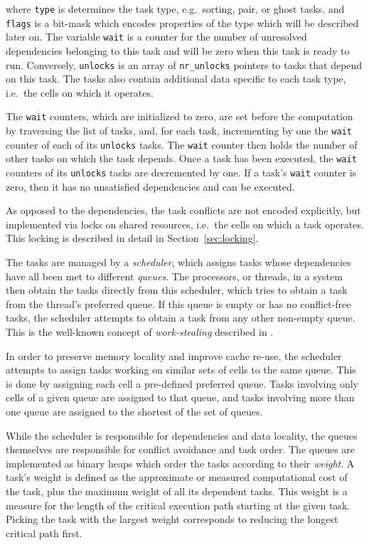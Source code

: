 \documentclass[final]{siamltex}
\newcommand{\sect}[1]
    {Section~\ref{sec:#1}}
\begin{document}
\noindent where {\tt type} is determines the task type, e.g.~sorting,
pair, or ghost tasks, and {\tt flags} is a bit-mask
which encodes properties of the type which will be described
later on.
The variable {\tt wait} is a counter for the number of
unresolved dependencies belonging to this task and will be
zero when this task is ready to run.
Conversely, {\tt unlocks} is an array of {\tt nr\_unlocks}
pointers to tasks that depend on this task.
The tasks also contain additional data specific to each task
type, i.e.~the cells on which it operates.

The {\tt wait} counters, which are initialized to zero, are
set before the computation by traversing the list of tasks, and,
for each task, incrementing by one the {\tt wait} counter of each of its
{\tt unlocks} tasks.
The {\tt wait} counter then holds the number of other tasks on which
the task depends.
Once a task has been executed, the {\tt wait} counters of its
{\tt unlocks} tasks are decremented by one.
If a task's {\tt wait} counter is zero, then it has no
unsatisfied dependencies and can be executed.

As opposed to the dependencies, the task conflicts are not
encoded explicitly, but implemented via locks on shared resources,
i.e.~the cells on which a task operates.
This locking is described in detail in \sect{locking}.

The tasks are managed by a {\em scheduler}, which assigns tasks
whose dependencies have all been met to different {\em queues}.
The processors, or threads, in a system then obtain the tasks
directly from this scheduler, which tries to obtain a task
from the thread's preferred queue.
If this queue is empty or has no conflict-free tasks, the scheduler
attempts to obtain a task from any other non-empty queue.
This is the well-known concept of {\em work-stealing} described
in \cite{ref:Blumofe1999}.

In order to preserve memory locality and improve cache re-use,
the scheduler attempts to assign tasks working on similar sets
of cells to the same queue.
This is done by assigning each cell a pre-defined preferred queue.
Tasks involving only cells of a given queue are assigned to that
queue, and tasks involving more than one queue are assigned to
the shortest of the set of queues.

While the scheduler is responsible for dependencies and data
locality, the queues themselves are responsible for conflict
avoidance and task order.
The queues are implemented as binary heaps which order the tasks
according to their {\em weight}.
A task's weight is defined as the approximate or
measured computational cost of the task, plus the maximum
weight of all its dependent tasks.
This weight is a measure for the length of the critical
execution path starting at the given task.
Picking the task with the largest weight corresponds to reducing
the longest critical path first.
\end{document}
